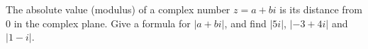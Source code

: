 The absolute value (modulus) of a complex number $z=a+bi$ is its distance from $0$ in the complex plane. Give a formula for $|a+bi|$, and find $|5i|$, $|-3+4i|$ and $|1-i|$.
